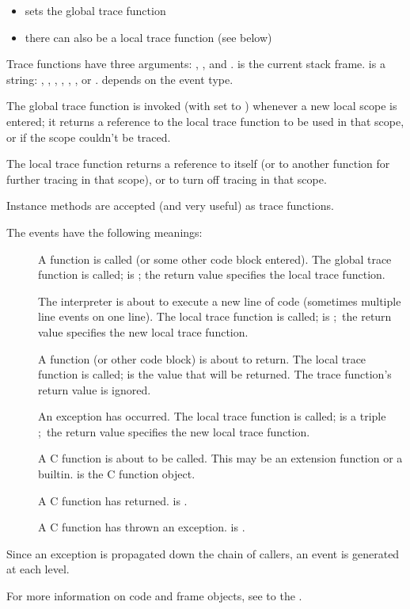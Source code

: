\begin{itemize}
\item {} sets the global trace function
\item there can also be a local trace function (see below)
\end{itemize}

Trace functions have three arguments: , , and
.  is the current stack frame.   is a
string: , , , ,
 , , or . 
 depends on the event type.

The global trace function is invoked (with  set to
) whenever a new local scope is entered; it returns
a reference to the local trace function to be used in that scope, or
 if the scope couldn't be traced.

The local trace function  returns a reference to itself (or to
another function for further tracing in that scope), or  to
turn off tracing in that scope.

Instance methods are accepted (and very useful) as trace functions.

The events have the following meanings:

\begin{description}

\item[]
A function is called (or some other code block entered).  The global
trace function is called;  is ;
the return value specifies the local trace function.

\item[]
The interpreter is about to execute a new line of code (sometimes
multiple line events on one line).  The local trace function is
called;  is ;\ the return value specifies the new
local trace function.

\item[]
A function (or other code block) is about to return.  The local trace
function is called;  is the value that will be returned.  The
trace function's return value is ignored.

\item[]
An exception has occurred.  The local trace function is called;
 is a triple ;\ the return value specifies the new local trace
function.

\item[]
A C function is about to be called.  This may be an extension function
or a builtin.   is the C function object.

\item[]
A C function has returned.  is .

\item[]
A C function has thrown an exception.   is .

\end{description}

Since an exception is propagated down the chain of callers, an
 event is generated at each level.

For more information on code and frame objects, see to the
.
